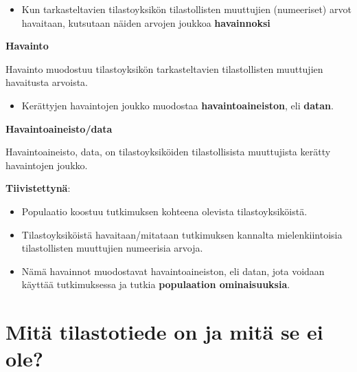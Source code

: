 \documentclass[
]{book}
\providecommand{\tightlist}{%
  \setlength{\itemsep}{0pt}\setlength{\parskip}{0pt}}
\begin{document}
\begin{itemize}
\tightlist
\item
  Kun tarkasteltavien tilastoyksikön tilastollisten muuttujien (numeeriset) arvot havaitaan, kutsutaan näiden arvojen joukkoa \textbf{havainnoksi}
\end{itemize}

\begin{defblock}{}
\textbf{Havainto}

Havainto muodostuu tilastoyksikön tarkasteltavien tilastollisten muuttujien havaitusta arvoista.

\end{defblock}

\begin{itemize}
\tightlist
\item
  Kerättyjen havaintojen joukko muodostaa \textbf{havaintoaineiston}, eli \textbf{datan}.
\end{itemize}

\begin{defblock}{}
\textbf{Havaintoaineisto/data}

Havaintoaineisto, data, on tilastoyksiköiden tilastollisista muuttujista kerätty havaintojen joukko.

\end{defblock}

\textbf{Tiivistettynä}:

\begin{itemize}
\tightlist
\item
  Populaatio koostuu tutkimuksen kohteena olevista tilastoyksiköistä.
\item
  Tilastoyksiköistä havaitaan/mitataan tutkimuksen kannalta mielenkiintoisia tilastollisten muuttujien numeerisia arvoja.
\item
  Nämä havainnot muodostavat havaintoaineiston, eli datan, jota voidaan käyttää tutkimuksessa ja tutkia \textbf{populaation ominaisuuksia}.
\end{itemize}

\newpage

\hypertarget{alaluku32}{%
\section{Mitä tilastotiede on ja mitä se ei ole?}\label{alaluku32}}
\end{document}
